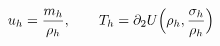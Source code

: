 \documentclass[preview]{standalone}
\begin{document}
\begin{align*}
\special{dvisvgm:raw <g id='unique000'>}u_h=\frac{m_h}{\rho_h},\qquad T_h=\partial_2U\Big(\rho_h,\frac{\sigma_h}{\rho_h}\Big)\special{dvisvgm:raw </g>}
\end{align*}
\end{document}
